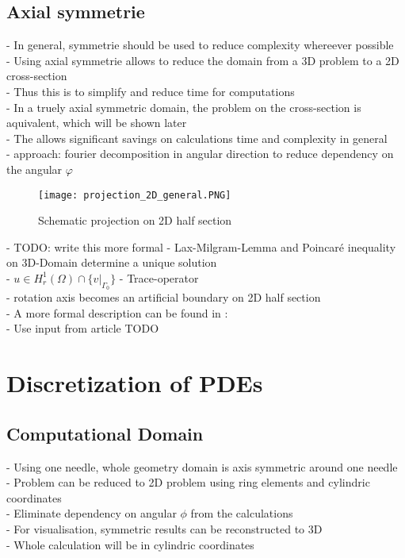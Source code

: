 \documentclass[parskip=half, titlepage=yes, 12pt, BCOR=12mm, DIV=calc]{scrartcl}
\begin{document}
\subsection{Axial symmetrie}
- In general, symmetrie should be used to reduce complexity whereever possible \\
- Using axial symmetrie allows to reduce the domain from a 3D problem to a 2D cross-section \\
- Thus this is to simplify and reduce time for computations \\
- In a truely axial symmetric domain, the problem on the cross-section is aquivalent, which will be shown later \\
- The allows significant savings on calculations time and complexity in general \\
- approach: fourier decomposition in angular direction to reduce dependency on the angular $\varphi$ \\

\begin{figure}[H]
    \centering
    \texttt{[image: projection\_2D\_general.PNG]}
    \caption{Schematic projection on 2D half section}
    \label{projection_2D_general}
\end{figure}


- TODO: write this more formal
- Lax-Milgram-Lemma and Poincaré inequality on 3D-Domain determine a unique solution \\
- $u \in H^{1}_{r}(\Omega) \cap \{ v|_{\Gamma_{0}} \}  $
- Trace-operator \\
- rotation axis becomes an artificial boundary on 2D half section \\

- A more formal description can be found in : \\
- Use input from article TODO \\


\section{Discretization of PDEs}

\subsection{Computational Domain}
- Using one needle, whole geometry domain is axis symmetric around one needle \\
- Problem can be reduced to 2D problem using ring elements and cylindric coordinates \\
- Eliminate dependency on angular $\phi$ from the calculations \\
- For visualisation, symmetric results can be reconstructed to 3D \\
- Whole calculation will be in cylindric coordinates \\
\end{document}
